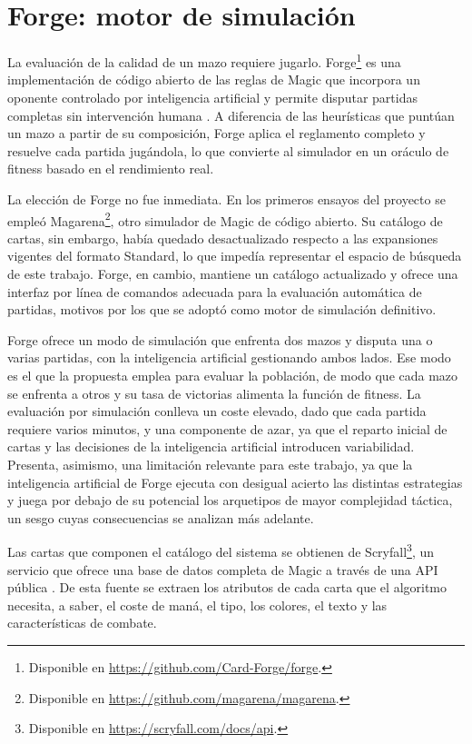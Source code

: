 \section{Forge: motor de simulación}
\label{sec:forge}

La evaluación de la calidad de un mazo requiere jugarlo. Forge\footnote{Disponible en \url{https://github.com/Card-Forge/forge}.} es una implementación de código abierto de las reglas de Magic que incorpora un oponente controlado por inteligencia artificial y permite disputar partidas completas sin intervención humana \cite{forge}. A diferencia de las heurísticas que puntúan un mazo a partir de su composición, Forge aplica el reglamento completo y resuelve cada partida jugándola, lo que convierte al simulador en un oráculo de fitness basado en el rendimiento real.

La elección de Forge no fue inmediata. En los primeros ensayos del proyecto se empleó Magarena\footnote{Disponible en \url{https://github.com/magarena/magarena}.}, otro simulador de Magic de código abierto. Su catálogo de cartas, sin embargo, había quedado desactualizado respecto a las expansiones vigentes del formato Standard, lo que impedía representar el espacio de búsqueda de este trabajo. Forge, en cambio, mantiene un catálogo actualizado y ofrece una interfaz por línea de comandos adecuada para la evaluación automática de partidas, motivos por los que se adoptó como motor de simulación definitivo.

Forge ofrece un modo de simulación que enfrenta dos mazos y disputa una o varias partidas, con la inteligencia artificial gestionando ambos lados. Ese modo es el que la propuesta emplea para evaluar la población, de modo que cada mazo se enfrenta a otros y su tasa de victorias alimenta la función de fitness. La evaluación por simulación conlleva un coste elevado, dado que cada partida requiere varios minutos, y una componente de azar, ya que el reparto inicial de cartas y las decisiones de la inteligencia artificial introducen variabilidad. Presenta, asimismo, una limitación relevante para este trabajo, ya que la inteligencia artificial de Forge ejecuta con desigual acierto las distintas estrategias y juega por debajo de su potencial los arquetipos de mayor complejidad táctica, un sesgo cuyas consecuencias se analizan más adelante.

Las cartas que componen el catálogo del sistema se obtienen de Scryfall\footnote{Disponible en \url{https://scryfall.com/docs/api}.}, un servicio que ofrece una base de datos completa de Magic a través de una API pública \cite{scryfall}. De esta fuente se extraen los atributos de cada carta que el algoritmo necesita, a saber, el coste de maná, el tipo, los colores, el texto y las características de combate.

